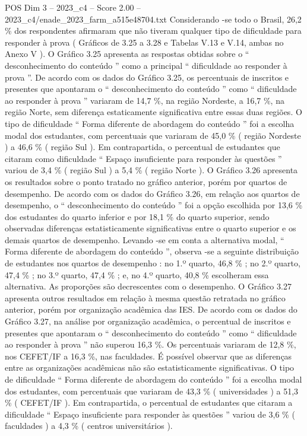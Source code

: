 \begin{textsample}{POS Dim 3 – 2023\_c4 – Score 2.00 – 2023\_c4/enade\_2023\_farm\_a515e48704.txt}
Considerando -se todo o Brasil, 26,2 \% dos respondentes afirmaram que não tiveram qualquer tipo de dificuldade para responder à prova ( Gráficos de 3.25 a 3.28 e Tabelas V.13 e V.14, ambas no Anexo V ).
O Gráfico 3.25 apresenta as respostas obtidas sobre o “ desconhecimento do conteúdo ” como a principal “ dificuldade ao responder à prova ”.
De acordo com os dados do Gráfico 3.25, os percentuais de inscritos e presentes que apontaram o “ desconhecimento do conteúdo ” como “ dificuldade ao responder à prova ” variaram de 14,7 \%, na região Nordeste, a 16,7 \%, na região Norte, sem diferença estaticamente significativa entre essas duas regiões.
O tipo de dificuldade “ Forma diferente de abordagem do conteúdo ” foi a escolha modal dos estudantes, com percentuais que variaram de 45,0 \% ( região Nordeste ) a 46,6 \% ( região Sul ).
Em contrapartida, o percentual de estudantes que citaram como dificuldade “ Espaço insuficiente para responder às questões ” variou de 3,4 \% ( região Sul ) a 5,4 \% ( região Norte ).
O Gráfico 3.26 apresenta os resultados sobre o ponto tratado no gráfico anterior, porém por quartos de desempenho.
De acordo com os dados do Gráfico 3.26, em relação aos quartos de desempenho, o “ desconhecimento do conteúdo ” foi a opção escolhida por 13,6 \% dos estudantes do quarto inferior e por 18,1 \% do quarto superior, sendo observadas diferenças estatisticamente significativas entre o quarto superior e os demais quartos de desempenho.
Levando -se em conta a alternativa modal, “ Forma diferente de abordagem do conteúdo ”, observa -se a seguinte distribuição de estudantes nos quartos de desempenho : no 1.º quarto, 46,8 \% ; no 2.º quarto, 47,4 \% ; no 3.º quarto, 47,4 \% ; e, no 4.º quarto, 40,8 \% escolheram essa alternativa.
As proporções são decrescentes com o desempenho.
O Gráfico 3.27 apresenta outros resultados em relação à mesma questão retratada no gráfico anterior, porém por organização acadêmica das IES.
De acordo com os dados do Gráfico 3.27, na análise por organização acadêmica, o percentual de inscritos e presentes que apontaram o “ desconhecimento do conteúdo ” como “ dificuldade ao responder à prova ” não superou 16,3 \%.
Os percentuais variaram de 12,8 \%, nos CEFET/IF a 16,3 \%, nas faculdades.
É possível observar que as diferenças entre as organizações acadêmicas não são estatisticamente significativas.
O tipo de dificuldade “ Forma diferente de abordagem do conteúdo ” foi a escolha modal dos estudantes, com percentuais que variaram de 43,3 \% ( universidades ) a 51,3 \% ( CEFET/IF ).
Em contrapartida, o percentual de estudantes que citaram a dificuldade “ Espaço insuficiente para responder às questões ” variou de 3,6 \% ( faculdades ) a 4,3 \% ( centros universitários ).

\end{textsample}
